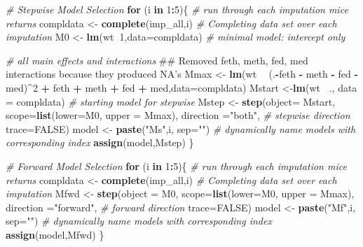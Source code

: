 \documentclass[]{article}
\newenvironment{Shaded}{\begin{snugshade}}{\end{snugshade}}
\newcommand{\KeywordTok}[1]{\textcolor[rgb]{0.13,0.29,0.53}{\textbf{#1}}}
\newcommand{\DataTypeTok}[1]{\textcolor[rgb]{0.13,0.29,0.53}{#1}}
\newcommand{\DecValTok}[1]{\textcolor[rgb]{0.00,0.00,0.81}{#1}}
\newcommand{\StringTok}[1]{\textcolor[rgb]{0.31,0.60,0.02}{#1}}
\newcommand{\CommentTok}[1]{\textcolor[rgb]{0.56,0.35,0.01}{\textit{#1}}}
\newcommand{\OtherTok}[1]{\textcolor[rgb]{0.56,0.35,0.01}{#1}}
\newcommand{\ControlFlowTok}[1]{\textcolor[rgb]{0.13,0.29,0.53}{\textbf{#1}}}
\newcommand{\OperatorTok}[1]{\textcolor[rgb]{0.81,0.36,0.00}{\textbf{#1}}}
\newcommand{\NormalTok}[1]{#1}
\begin{document}
\begin{Shaded}
\begin{Highlighting}[]
\CommentTok{# Stepwise Model Selection}
\ControlFlowTok{for}\NormalTok{ (i }\ControlFlowTok{in} \DecValTok{1}\OperatorTok{:}\DecValTok{5}\NormalTok{)\{ }\CommentTok{# run through each imputation mice returns }
\NormalTok{  compldata <-}\StringTok{ }\KeywordTok{complete}\NormalTok{(imp_all,i) }\CommentTok{# Completing data set over each imputation}
\NormalTok{  M0 <-}\StringTok{ }\KeywordTok{lm}\NormalTok{(wt}\OperatorTok{~}\DecValTok{1}\NormalTok{,}\DataTypeTok{data=}\NormalTok{compldata) }\CommentTok{# minimal model: intercept only}
  
  \CommentTok{# all main effects and interactions}
\NormalTok{  ##  Removed feth, meth, fed, med interactions because they produced NA's}
\NormalTok{  Mmax <-}\StringTok{ }\KeywordTok{lm}\NormalTok{(wt }\OperatorTok{~}\StringTok{ }\NormalTok{(.}\OperatorTok{-}\NormalTok{feth }\OperatorTok{-}\StringTok{ }\NormalTok{meth }\OperatorTok{-}\StringTok{ }\NormalTok{fed }\OperatorTok{-}\StringTok{ }\NormalTok{med)}\OperatorTok{^}\DecValTok{2} \OperatorTok{+}\StringTok{ }\NormalTok{feth }\OperatorTok{+}\StringTok{ }\NormalTok{meth }\OperatorTok{+}\StringTok{ }\NormalTok{fed }\OperatorTok{+}\StringTok{ }\NormalTok{med,}\DataTypeTok{data=}\NormalTok{compldata)}
\NormalTok{  Mstart <-}\KeywordTok{lm}\NormalTok{(wt }\OperatorTok{~}\NormalTok{., }\DataTypeTok{data =}\NormalTok{ compldata) }\CommentTok{# starting model for stepwise}
\NormalTok{  Mstep <-}\StringTok{ }\KeywordTok{step}\NormalTok{(}\DataTypeTok{object=}\NormalTok{ Mstart,}
              \DataTypeTok{scope=}\KeywordTok{list}\NormalTok{(}\DataTypeTok{lower=}\NormalTok{M0, }\DataTypeTok{upper =}\NormalTok{ Mmax),}
              \DataTypeTok{direction =}\StringTok{"both"}\NormalTok{, }\CommentTok{# stepwise direction }
              \DataTypeTok{trace=}\OtherTok{FALSE}\NormalTok{)}
\NormalTok{  model <-}\StringTok{ }\KeywordTok{paste}\NormalTok{(}\StringTok{"Ms"}\NormalTok{,i, }\DataTypeTok{sep=}\StringTok{""}\NormalTok{) }\CommentTok{# dynamically name models with corresponding index}
  \KeywordTok{assign}\NormalTok{(model,Mstep)}
\NormalTok{\}}

\CommentTok{# Forward Model Selection}
\ControlFlowTok{for}\NormalTok{ (i }\ControlFlowTok{in} \DecValTok{1}\OperatorTok{:}\DecValTok{5}\NormalTok{)\{ }\CommentTok{# run through each imputation mice returns }
\NormalTok{  compldata <-}\StringTok{ }\KeywordTok{complete}\NormalTok{(imp_all,i) }\CommentTok{# Completing data set over each imputation}
\NormalTok{  Mfwd <-}\StringTok{ }\KeywordTok{step}\NormalTok{(}\DataTypeTok{object =}\NormalTok{ M0,}
              \DataTypeTok{scope=}\KeywordTok{list}\NormalTok{(}\DataTypeTok{lower=}\NormalTok{M0, }\DataTypeTok{upper =}\NormalTok{ Mmax),}
              \DataTypeTok{direction =}\StringTok{"forward"}\NormalTok{, }\CommentTok{# forward direction }
              \DataTypeTok{trace=}\OtherTok{FALSE}\NormalTok{)}
\NormalTok{  model <-}\StringTok{ }\KeywordTok{paste}\NormalTok{(}\StringTok{"Mf"}\NormalTok{,i, }\DataTypeTok{sep=}\StringTok{""}\NormalTok{) }\CommentTok{# dynamically name models with corresponding index}
  \KeywordTok{assign}\NormalTok{(model,Mfwd)}
\NormalTok{\}}


\end{Highlighting}
\end{Shaded}
\end{document}
